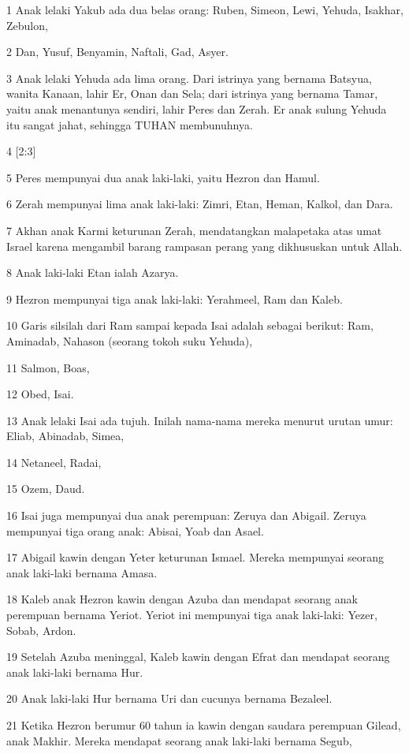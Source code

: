 \par 1 Anak lelaki Yakub ada dua belas orang: Ruben, Simeon, Lewi, Yehuda, Isakhar, Zebulon,
\par 2 Dan, Yusuf, Benyamin, Naftali, Gad, Asyer.
\par 3 Anak lelaki Yehuda ada lima orang. Dari istrinya yang bernama Batsyua, wanita Kanaan, lahir Er, Onan dan Sela; dari istrinya yang bernama Tamar, yaitu anak menantunya sendiri, lahir Peres dan Zerah. Er anak sulung Yehuda itu sangat jahat, sehingga TUHAN membunuhnya.
\par 4 [2:3]
\par 5 Peres mempunyai dua anak laki-laki, yaitu Hezron dan Hamul.
\par 6 Zerah mempunyai lima anak laki-laki: Zimri, Etan, Heman, Kalkol, dan Dara.
\par 7 Akhan anak Karmi keturunan Zerah, mendatangkan malapetaka atas umat Israel karena mengambil barang rampasan perang yang dikhususkan untuk Allah.
\par 8 Anak laki-laki Etan ialah Azarya.
\par 9 Hezron mempunyai tiga anak laki-laki: Yerahmeel, Ram dan Kaleb.
\par 10 Garis silsilah dari Ram sampai kepada Isai adalah sebagai berikut: Ram, Aminadab, Nahason (seorang tokoh suku Yehuda),
\par 11 Salmon, Boas,
\par 12 Obed, Isai.
\par 13 Anak lelaki Isai ada tujuh. Inilah nama-nama mereka menurut urutan umur: Eliab, Abinadab, Simea,
\par 14 Netaneel, Radai,
\par 15 Ozem, Daud.
\par 16 Isai juga mempunyai dua anak perempuan: Zeruya dan Abigail. Zeruya mempunyai tiga orang anak: Abisai, Yoab dan Asael.
\par 17 Abigail kawin dengan Yeter keturunan Ismael. Mereka mempunyai seorang anak laki-laki bernama Amasa.
\par 18 Kaleb anak Hezron kawin dengan Azuba dan mendapat seorang anak perempuan bernama Yeriot. Yeriot ini mempunyai tiga anak laki-laki: Yezer, Sobab, Ardon.
\par 19 Setelah Azuba meninggal, Kaleb kawin dengan Efrat dan mendapat seorang anak laki-laki bernama Hur.
\par 20 Anak laki-laki Hur bernama Uri dan cucunya bernama Bezaleel.
\par 21 Ketika Hezron berumur 60 tahun ia kawin dengan saudara perempuan Gilead, anak Makhir. Mereka mendapat seorang anak laki-laki bernama Segub,
